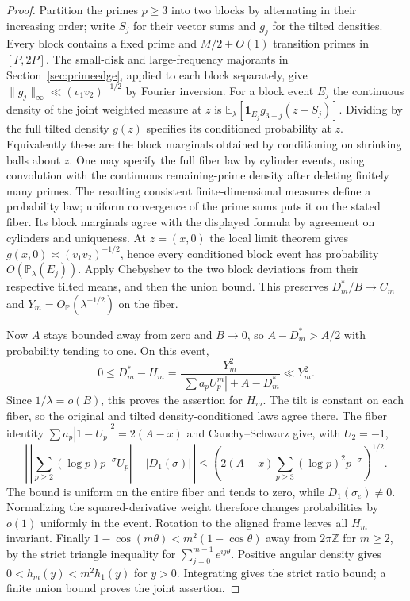 \documentclass[11pt]{article}
\begin{document}
\begin{proof}
Partition the primes $p\ge3$ into two blocks by alternating in their
increasing order; write $S_j$ for their vector sums and $g_j$ for the
tilted densities. Every block contains a fixed prime and
$M/2+O(1)$ transition primes in $[P,2P]$. The small-disk and
large-frequency majorants in Section~\ref{sec:primeedge}, applied to
each block separately, give
$\|g_j\|_\infty\ll(v_1v_2)^{-1/2}$ by Fourier inversion.
For a block event $E_j$ the continuous density of the joint weighted
measure at $z$ is
$\mathbb E_\lambda[\mathbf1_{E_j}g_{3-j}(z-S_j)]$.
Dividing by the full tilted density $g(z)$ specifies its conditioned
probability at $z$. Equivalently these are the block marginals obtained
by conditioning on shrinking balls about $z$. One may specify the
full fiber law by cylinder events, using convolution with the
continuous remaining-prime density after deleting finitely many
primes. The resulting consistent finite-dimensional measures define
a probability law; uniform convergence of the prime sums puts it on
the stated fiber. Its block marginals agree with the displayed formula
by agreement on cylinders and uniqueness. At $z=(x,0)$ the local
limit theorem gives $g(x,0)\asymp(v_1v_2)^{-1/2}$, hence every
conditioned block event has probability $O(\mathbb P_\lambda(E_j))$.
Apply Chebyshev to the two block deviations from their respective
tilted means, and then the union bound. This preserves
$D_m^*/B\to C_m$ and $Y_m=O_{\mathbb P}(\lambda^{-1/2})$ on the fiber.

Now $A$ stays bounded away from zero and $B\to0$, so $A-D_m^*>A/2$
with probability tending to one. On this event,
\[
 0\le D_m^*-H_m
 =\frac{Y_m^2}{|\sum a_pU_p^m|+A-D_m^*}\ll Y_m^2.
\]
Since $1/\lambda=o(B)$, this proves the assertion for $H_m$.
The tilt is constant on each fiber, so the original and tilted
density-conditioned laws agree there. The fiber identity
$\sum a_p|1-U_p|^2=2(A-x)$ and Cauchy--Schwarz give, with
$U_2=-1$,
\[
 \left|\,\left|\sum_{p\ge2}(\log p)p^{-\sigma}U_p\right|
             -|D_1(\sigma)|\,\right|
 \le \left(2(A-x)\sum_{p\ge3}(\log p)^2p^{-\sigma}\right)^{1/2}.
\]
The bound is uniform on the entire fiber and tends to zero, while
$D_1(\sigma_e)\ne0$. Normalizing the squared-derivative weight
therefore changes probabilities by $o(1)$ uniformly in the event.
Rotation to the aligned frame leaves all $H_m$ invariant.
Finally $1-\cos(m\theta)<m^2(1-\cos\theta)$ away from
$2\pi\mathbb Z$ for $m\ge2$, by the strict triangle inequality for
$\sum_{j=0}^{m-1}e^{ij\theta}$. Positive angular density gives
$0<h_m(y)<m^2h_1(y)$ for $y>0$. Integrating gives the strict ratio
bound; a finite union bound proves the joint assertion.
\end{proof}
\end{document}
